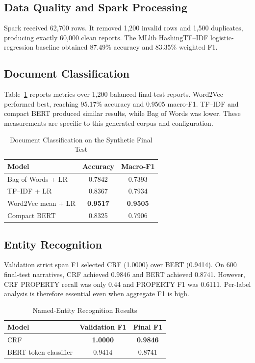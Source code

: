 \documentclass[conference]{IEEEtran}
\begin{document}
\subsection{Data Quality and Spark Processing}

Spark received 62,700 rows. It removed 1,200 invalid rows and 1,500 duplicates, producing exactly 60,000 clean reports. The MLlib HashingTF--IDF logistic-regression baseline obtained 87.49\% accuracy and 83.35\% weighted F1.

\subsection{Document Classification}

Table~\ref{tab:doc-results} reports metrics over 1,200 balanced final-test reports. Word2Vec performed best, reaching 95.17\% accuracy and 0.9505 macro-F1. TF--IDF and compact BERT produced similar results, while Bag of Words was lower. These measurements are specific to this generated corpus and configuration.

\begin{table}[t]
\centering
\caption{Document Classification on the Synthetic Final Test}
\label{tab:doc-results}
\renewcommand{\arraystretch}{1.15}
\begin{tabular}{lcc}
\toprule
\textbf{Model} & \textbf{Accuracy} & \textbf{Macro-F1}\\
\midrule
Bag of Words + LR & 0.7842 & 0.7393\\
TF--IDF + LR & 0.8367 & 0.7934\\
Word2Vec mean + LR & \textbf{0.9517} & \textbf{0.9505}\\
Compact BERT & 0.8325 & 0.7906\\
\bottomrule
\end{tabular}
\end{table}

\subsection{Entity Recognition}

Validation strict span F1 selected CRF (1.0000) over BERT (0.9414). On 600 final-test narratives, CRF achieved 0.9846 and BERT achieved 0.8741. However, CRF PROPERTY recall was only 0.44 and PROPERTY F1 was 0.6111. Per-label analysis is therefore essential even when aggregate F1 is high.

\begin{table}[t]
\centering
\caption{Named-Entity Recognition Results}
\label{tab:ner-results}
\renewcommand{\arraystretch}{1.15}
\begin{tabular}{lcc}
\toprule
\textbf{Model} & \textbf{Validation F1} & \textbf{Final F1}\\
\midrule
CRF & \textbf{1.0000} & \textbf{0.9846}\\
BERT token classifier & 0.9414 & 0.8741\\
\bottomrule
\end{tabular}
\end{table}
\end{document}
